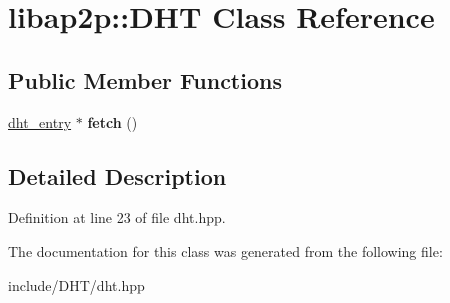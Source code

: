 \hypertarget{classlibap2p_1_1DHT}{\section{libap2p\-:\-:D\-H\-T Class Reference}
\label{classlibap2p_1_1DHT}
}
\subsection*{Public Member Functions}
\begin{DoxyCompactItemize}
\item 
\hypertarget{classlibap2p_1_1DHT_a2be1b5d1723483db68c7f9d31307f354}{\hyperlink{classlibap2p_1_1dht__entry}{dht\-\_\-entry} $\ast$ {\bfseries fetch} ()}\label{classlibap2p_1_1DHT_a2be1b5d1723483db68c7f9d31307f354}

\end{DoxyCompactItemize}


\subsection{Detailed Description}


Definition at line 23 of file dht.\-hpp.



The documentation for this class was generated from the following file\-:\begin{DoxyCompactItemize}
\item 
include/\-D\-H\-T/dht.\-hpp\end{DoxyCompactItemize}
